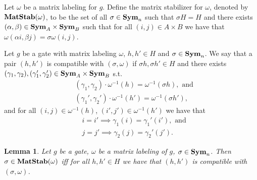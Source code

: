 \documentclass[12pt]{report}
\newtheorem{lem}[thm]{Lemma} \newtheorem{prop}[thm]{Proposition}
\newcommand{\matstab}{\text{\textbf{MatStab}}}
\newcommand{\sym}{\text{\textbf{Sym}}}
\newcommand{\consp}{\text{sp}}
\begin{document}


\begin{definition}
  Let $\omega$ be a matrix labeling for $g$. Define the matrix stabilizer for
  $\omega$, denoted by $\matstab(\omega)$, to be the set of all $\sigma \in
  \sym_n$ such that $\sigma H = H$ and there exists $(\alpha, \beta) \in \sym_A
  \times \sym_B$ such that for all $(i,j) \in A \times B$ we have that $\omega
  (\alpha i, \beta j) = \sigma \omega (i,j)$.
\end{definition}


\begin{definition}
  Let $g$ be a gate with matrix labeling $\omega$, $h,h' \in H$ and $\sigma \in
  \sym_n$. We say that a pair $(h, h')$ is compatible with $(\sigma, \omega)$ if
  $\sigma h, \sigma h' \in H$ and there exists $(\gamma_1, \gamma_2),
  (\gamma_1', \gamma_2') \in \sym_A \times \sym_B$ s.t.
  \begin{align*}
    &(\gamma_1, \gamma_2) \cdot \omega^{-1} (h) = \omega^{-1}(\sigma h), \text{ and} \\ 
    &(\gamma_1', \gamma_2') \cdot \omega^{-1} (h') = \omega^{-1}(\sigma h'),
  \end{align*}
  and for all $(i,j) \in \omega^{-1}(h)$, $(i',j') \in \omega^{-1}(h')$ we have
  that
  \begin{align*}
    &i =i' \implies \gamma_1(i) = \gamma_1'(i'), \text{ and} \\
    &j =j' \implies \gamma_2(j) = \gamma_2'(j').
  \end{align*}

\end{definition}

\begin{lem}
  Let $g$ be a gate, $\omega$ be a matrix labeling of $g$, $\sigma \in \sym_n$.
  Then $\sigma \in \matstab(\omega)$ iff for all $h,h' \in H$ we have that
  $(h,h')$ is compatible with $(\sigma, \omega)$.
\end{lem}
\end{document}
